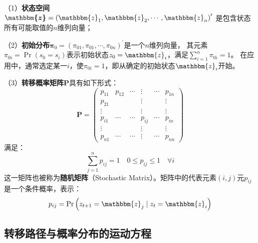 （1）\textbf{状态空间}$\boldsymbol{\mathbbm{z}}=\left(\mathbbm{z}_1,\mathbbm{z}_2,\cdots,\mathbbm{z}_n\right)^{\prime}$
是包含状态所有可能取值的$n$维列向量；

（2）\textbf{初始分布}$\boldsymbol{\pi}_0=\left(\pi_{01},\pi_{01},\cdots,\pi_{0n}\right)^{\prime}$是一个$n$维列向量，
其元素$\pi_{0i}=\operatorname{Pr}\left(s_0=s_i\right)$表示初始状态$z_0=\mathbbm{z}_i$，满足$\sum_{i=1}^{n}\pi_{0i}=1$。
在应用中，通常选定某一$i$，使$\pi_{0i}=1$，即从确定的初始状态$\mathbbm{z}_i$开始。

（3）\textbf{转移概率矩阵}$\boldsymbol{P}$具有如下形式：
\begin{equation*}
    \boldsymbol{P}=\left(\begin{array}{cccccc}
        p_{11} & p_{12} & \cdots & \vdots & \cdots & p_{1 n} \\
        p_{21} & & & \vdots & & \vdots \\
        \vdots & & & \vdots & & \vdots \\
        p_{i 1} & \cdots & \cdots & p_{i j} & \cdots & p_{i n} \\
        \vdots & & & \vdots & & \vdots \\
        p_{n 1} & \cdots & \cdots & \vdots & \cdots & p_{n n}
        \end{array}\right)
\end{equation*}
满足：
\begin{equation*}   
    \sum_{j=1}^{n}p_{ij}=1 \quad 0\leq p_{ij}\leq 1 \quad \forall i
\end{equation*}
这一矩阵也被称为\textbf{随机矩阵}（Stochastic Matrix）。矩阵中的代表元素$\left(i,j\right)$元$p_{ij}$是一个条件概率，表示：
\begin{equation*}
    p_{ij}=\operatorname{Pr}\left(z_{t+1}=\mathbbm{z}_j\mid z_t = \mathbbm{z}_i\right)
\end{equation*}


\subsection{转移路径与概率分布的运动方程}

